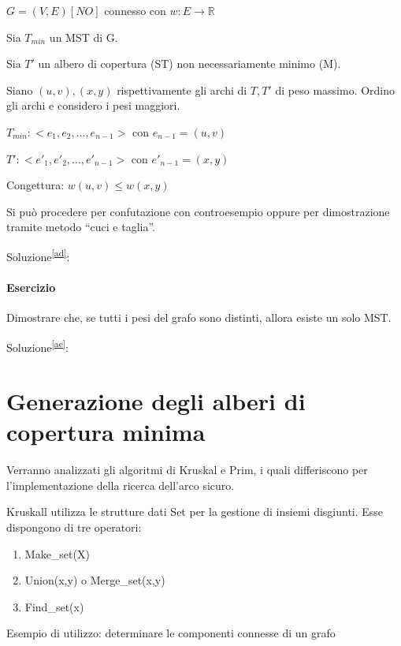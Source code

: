 $G=(V,E) [NO]$ connesso con $w:E \rightarrow \mathbb{R}$

{Sia $T_{min}$ un MST di G.}

{Sia $T'$ un albero di copertura (ST) non necessariamente minimo (M).}

{Siano $(u,v),(x,y)$ rispettivamente gli archi di $T,T'$ di peso massimo. Ordino gli archi e considero i pesi maggiori.}

$T_{min}: <e_1,e_2,\ldots,e_{n-1}>$ con $e_{n-1} = (u,v)$

$T': <e'_1,e'_2,\ldots,e'_{n-1}>$ con $e'_{n-1} = (x,y)$

{Congettura: $w(u,v) \leq w(x,y)$}

{Si può procedere per confutazione con controesempio oppure per dimostrazione tramite metodo ``cuci e taglia''.}

{Soluzione}\textsuperscript{\protect\hyperlink{cmnt30}{{[}ad{]}}}{:}

\paragraph{Esercizio}

{Dimostrare che, se tutti i pesi del grafo sono distinti, allora esiste un solo MST.}

{Soluzione}\textsuperscript{\protect\hyperlink{cmnt31}{{[}ae{]}}}{:}

\section{Generazione degli alberi di copertura minima}



{Verranno analizzati gli algoritmi di Kruskal e Prim, i quali differiscono per l'implementazione della ricerca dell'arco sicuro.}

{Kruskall utilizza le strutture dati Set per la gestione di insiemi disgiunti. Esse dispongono di tre operatori:}

\begin{enumerate}
\tightlist
\item
  {Make\_set(X)}
\item
  {Union(x,y) o Merge\_set(x,y)}
\item
  {Find\_set(x)}
\end{enumerate}

{Esempio di utilizzo: determinare le componenti connesse di un grafo}




